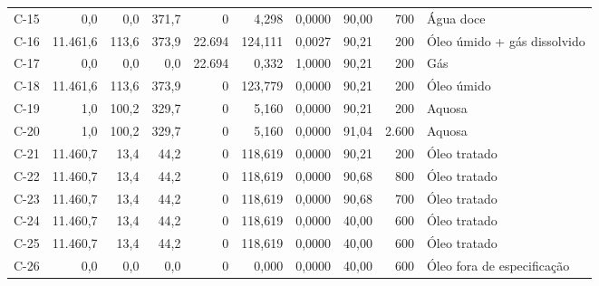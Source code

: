\documentclass[11pt,a4paper]{article}
\numberwithin{equation}{section}
\numberwithin{table}{section}
\numberwithin{figure}{section}
\begin{document}
{\begin{longtable}{lrrrrrrrrL{2.5cm}}
C-15 & 0,0 & 0,0 & 371,7 & 0 & 4,298 & 0,0000 & 90,00 & 700 & {\scriptsize Água doce}\\
C-16 & 11.461,6 & 113,6 & 373,9 & 22.694 & 124,111 & 0,0027 & 90,21 & 200 & {\scriptsize Óleo úmido + gás dissolvido}\\
C-17 & 0,0 & 0,0 & 0,0 & 22.694 & 0,332 & 1,0000 & 90,21 & 200 & {\scriptsize Gás}\\
C-18 & 11.461,6 & 113,6 & 373,9 & 0 & 123,779 & 0,0000 & 90,21 & 200 & {\scriptsize Óleo úmido}\\
C-19 & 1,0 & 100,2 & 329,7 & 0 & 5,160 & 0,0000 & 90,21 & 200 & {\scriptsize Aquosa}\\
C-20 & 1,0 & 100,2 & 329,7 & 0 & 5,160 & 0,0000 & 91,04 & 2.600 & {\scriptsize Aquosa}\\
C-21 & 11.460,7 & 13,4 & 44,2 & 0 & 118,619 & 0,0000 & 90,21 & 200 & {\scriptsize Óleo tratado}\\
C-22 & 11.460,7 & 13,4 & 44,2 & 0 & 118,619 & 0,0000 & 90,68 & 800 & {\scriptsize Óleo tratado}\\
C-23 & 11.460,7 & 13,4 & 44,2 & 0 & 118,619 & 0,0000 & 90,68 & 700 & {\scriptsize Óleo tratado}\\
C-24 & 11.460,7 & 13,4 & 44,2 & 0 & 118,619 & 0,0000 & 40,00 & 600 & {\scriptsize Óleo tratado}\\
C-25 & 11.460,7 & 13,4 & 44,2 & 0 & 118,619 & 0,0000 & 40,00 & 600 & {\scriptsize Óleo tratado}\\
C-26 & 0,0 & 0,0 & 0,0 & 0 & 0,000 & 0,0000 & 40,00 & 600 & {\scriptsize Óleo fora de especificação}\\
\bottomrule\end{longtable}}
\end{document}
